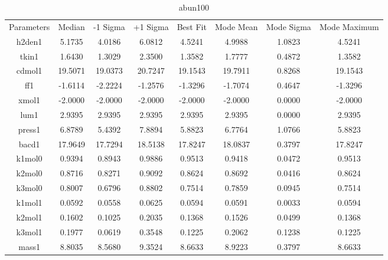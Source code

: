 \begin{table}
\caption{abun100}
\begin{tabular}{cccccccc}
Parameters & Median & -1 Sigma & +1 Sigma & Best Fit & Mode Mean & Mode Sigma & Mode Maximum \\
h2den1 & 5.1735 & 4.0186 & 6.0812 & 4.5241 & 4.9988 & 1.0823 & 4.5241 \\
tkin1 & 1.6430 & 1.3029 & 2.3500 & 1.3582 & 1.7777 & 0.4872 & 1.3582 \\
cdmol1 & 19.5071 & 19.0373 & 20.7247 & 19.1543 & 19.7911 & 0.8268 & 19.1543 \\
ff1 & -1.6114 & -2.2224 & -1.2576 & -1.3296 & -1.7074 & 0.4647 & -1.3296 \\
xmol1 & -2.0000 & -2.0000 & -2.0000 & -2.0000 & -2.0000 & 0.0000 & -2.0000 \\
lum1 & 2.9395 & 2.9395 & 2.9395 & 2.9395 & 2.9395 & 0.0000 & 2.9395 \\
press1 & 6.8789 & 5.4392 & 7.8894 & 5.8823 & 6.7764 & 1.0766 & 5.8823 \\
bacd1 & 17.9649 & 17.7294 & 18.5138 & 17.8247 & 18.0837 & 0.3797 & 17.8247 \\
k1mol0 & 0.9394 & 0.8943 & 0.9886 & 0.9513 & 0.9418 & 0.0472 & 0.9513 \\
k2mol0 & 0.8716 & 0.8271 & 0.9092 & 0.8624 & 0.8692 & 0.0416 & 0.8624 \\
k3mol0 & 0.8007 & 0.6796 & 0.8802 & 0.7514 & 0.7859 & 0.0945 & 0.7514 \\
k1mol1 & 0.0592 & 0.0558 & 0.0625 & 0.0594 & 0.0591 & 0.0033 & 0.0594 \\
k2mol1 & 0.1602 & 0.1025 & 0.2035 & 0.1368 & 0.1526 & 0.0499 & 0.1368 \\
k3mol1 & 0.1977 & 0.0619 & 0.3548 & 0.1225 & 0.2062 & 0.1238 & 0.1225 \\
mass1 & 8.8035 & 8.5680 & 9.3524 & 8.6633 & 8.9223 & 0.3797 & 8.6633 \\
\end{tabular}
\end{table}
